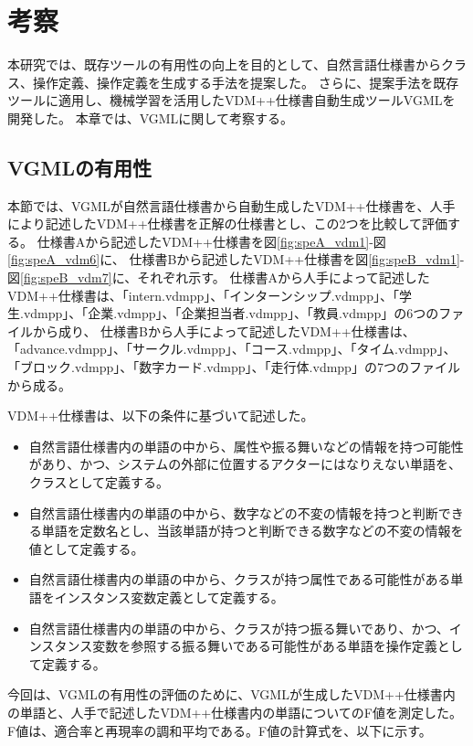 \chapter{考察}
\label{cha:Discussion}

本研究では、既存ツールの有用性の向上を目的として、自然言語仕様書からクラス、操作定義、操作定義を生成する手法を提案した。
さらに、提案手法を既存ツールに適用し、機械学習を活用したVDM++仕様書自動生成ツールVGMLを開発した。
本章では、VGMLに関して考察する。

\section{VGMLの有用性}
本節では、VGMLが自然言語仕様書から自動生成したVDM++仕様書を、人手により記述したVDM++仕様書を正解の仕様書とし、この2つを比較して評価する。
仕様書Aから記述したVDM++仕様書を図\ref{fig:speA_vdm1}-図\ref{fig:speA_vdm6}に、
仕様書Bから記述したVDM++仕様書を図\ref{fig:speB_vdm1}-図\ref{fig:speB_vdm7}に、それぞれ示す。
仕様書Aから人手によって記述したVDM++仕様書は、「intern.vdmpp」、「インターンシップ.vdmpp」、「学生.vdmpp」、「企業.vdmpp」、「企業担当者.vdmpp」、「教員.vdmpp」の6つのファイルから成り、
仕様書Bから人手によって記述したVDM++仕様書は、「advance.vdmpp」、「サークル.vdmpp」、「コース.vdmpp」、「タイム.vdmpp」、「ブロック.vdmpp」、「数字カード.vdmpp」、「走行体.vdmpp」の7つのファイルから成る。

VDM++仕様書は、以下の条件に基づいて記述した。

\begin{itemize}
    \item 自然言語仕様書内の単語の中から、属性や振る舞いなどの情報を持つ可能性があり、かつ、システムの外部に位置するアクターにはなりえない単語を、クラスとして定義する。
    \item 自然言語仕様書内の単語の中から、数字などの不変の情報を持つと判断できる単語を定数名とし、当該単語が持つと判断できる数字などの不変の情報を値として定義する。
    \item 自然言語仕様書内の単語の中から、クラスが持つ属性である可能性がある単語をインスタンス変数定義として定義する。
    \item 自然言語仕様書内の単語の中から、クラスが持つ振る舞いであり、かつ、インスタンス変数を参照する振る舞いである可能性がある単語を操作定義として定義する。
\end{itemize}

今回は、VGMLの有用性の評価のために、VGMLが生成したVDM++仕様書内の単語と、人手で記述したVDM++仕様書内の単語についてのF値\cite{F_value}を測定した。
F値は、適合率と再現率の調和平均である。F値の計算式を、以下に示す。

